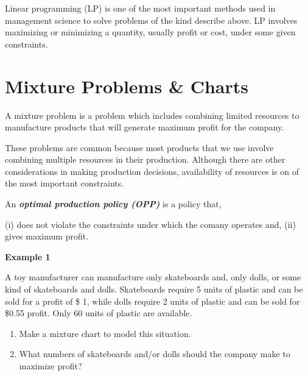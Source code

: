 \documentclass[
  letterpaper,
  DIV=11,
  numbers=noendperiod]{scrreprt}
\newenvironment{Shaded}{\begin{snugshade}}{\end{snugshade}}
\newcommand{\DataTypeTok}[1]{\textcolor[rgb]{0.68,0.00,0.00}{#1}}
\newcommand{\ErrorTok}[1]{\textcolor[rgb]{0.68,0.00,0.00}{#1}}
\newcommand{\KeywordTok}[1]{\textcolor[rgb]{0.00,0.23,0.31}{#1}}
\providecommand{\tightlist}{%
  \setlength{\itemsep}{0pt}\setlength{\parskip}{0pt}}\usepackage{longtable,booktabs,array}
\begin{document}
Linear programming (LP) is one of the most important methods used in
management science to solve problems of the kind describe above. LP
involves maximizing or minimizing a quantity, usually profit or cost,
under some given constraints.

\hypertarget{mixture-problems-charts}{%
\section{Mixture Problems \& Charts}\label{mixture-problems-charts}}

A mixture problem is a problem which includes combining limited
resources to manufacture products that will generate maximum profit for
the company.

These problems are common because most products that we use involve
combining multiple resources in their production. Although there are
other considerations in making production decisions, availability of
resources is on of the most important constraints.

An \textbf{\emph{optimal production policy (OPP)}} is a policy that,

\begin{Shaded}
\begin{Highlighting}[]
\ErrorTok{(}\DataTypeTok{i}\ErrorTok{)} \DataTypeTok{does} \DataTypeTok{not} \DataTypeTok{violate} \DataTypeTok{the} \DataTypeTok{constraints} \DataTypeTok{under} \DataTypeTok{which} \DataTypeTok{the} \DataTypeTok{comany} \DataTypeTok{operates} \DataTypeTok{and}\ErrorTok{,}
\ErrorTok{(}\DataTypeTok{ii}\ErrorTok{)} \DataTypeTok{gives} \DataTypeTok{maximum} \DataTypeTok{profit}\KeywordTok{.}
\end{Highlighting}
\end{Shaded}

\textbf{Example 1}

A toy manufacturer can manufacture only skateboards and, only dolls, or
some kind of skateboards and dolls. Skateboards require 5 units of
plastic and can be sold for a profit of \$ 1, while dolls require 2
units of plastic and can be sold for \$0.55 profit. Only 60 units of
plastic are available.

\begin{enumerate}
\def\labelenumi{(\alph{enumi})}
\tightlist
\item
  Make a mixture chart to model this situation.
\item
  What numbers of skateboards and/or dolls should the company make to
  maximize profit?
\end{enumerate}
\end{document}
